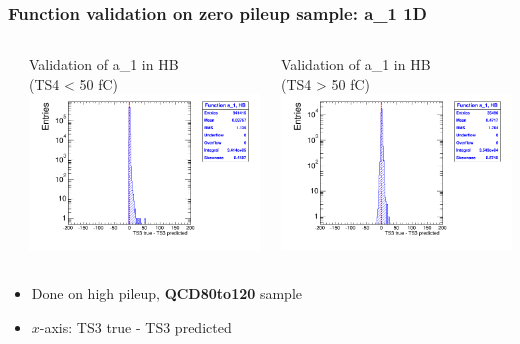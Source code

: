 \documentclass[bigger]{beamer}
\providecommand{\alert}[1]{\textbf{#1}}
\begin{document}
\begin{frame}
\frametitle{Function validation on zero pileup sample: a\_1 1D}
\label{sec-3-2-4}
\begin{columns} %
\label{sec-3-2-4-1}
\begin{column}{0.55\textwidth}
\label{sec-3-2-4-1-1}

\centering
Validation of a\_1 in HB \\ (TS4 < 50 fC)
\includegraphics[width=\textwidth]{fig/crosscheck_1D_sample80to120_a0_under50_ring0.png}
\end{column}
\begin{column}{0.55\textwidth}
\label{sec-3-2-4-1-2}

\centering
Validation of a\_1 in HB \\ (TS4 > 50 fC)
\includegraphics[width=\textwidth]{fig/crosscheck_1D_sample80to120_a0_over50_ring0.png}
\end{column}
\end{columns}
\label{sec-3-2-4-2}
\begin{itemize}

\item Done on high pileup, \alert{QCD80to120} sample
\label{sec-3-2-4-2-1}%

\item $x$-axis: TS3 true - TS3 predicted
\label{sec-3-2-4-2-2}%
\end{itemize} %
\end{frame}
\end{document}
